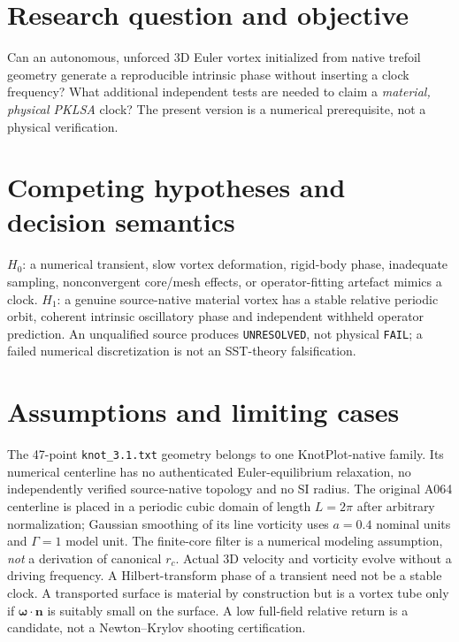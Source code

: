 \documentclass[11pt,a4paper]{article}
\begin{document}
\section{Research question and objective}
Can an autonomous, unforced 3D Euler vortex initialized from native trefoil geometry generate a reproducible intrinsic phase without inserting a clock frequency? What additional independent tests are needed to claim a \emph{material, physical PKLSA} clock? The present version is a numerical prerequisite, not a physical verification.

\section{Competing hypotheses and decision semantics}
$H_0$: a numerical transient, slow vortex deformation, rigid-body phase, inadequate sampling, nonconvergent core/mesh effects, or operator-fitting artefact mimics a clock. $H_1$: a genuine source-native material vortex has a stable relative periodic orbit, coherent intrinsic oscillatory phase and independent withheld operator prediction. An unqualified source produces \texttt{UNRESOLVED}, not physical \texttt{FAIL}; a failed numerical discretization is not an SST-theory falsification.

\section{Assumptions and limiting cases}
The 47-point \texttt{knot\_3.1.txt} geometry belongs to one KnotPlot-native family. Its numerical centerline has no authenticated Euler-equilibrium relaxation, no independently verified source-native topology and no SI radius. The original A064 centerline is placed in a periodic cubic domain of length $L=2\pi$ after arbitrary normalization; Gaussian smoothing of its line vorticity uses $a=0.4$ nominal units and $\Gamma=1$ model unit. The finite-core filter is a numerical modeling assumption, \emph{not} a derivation of canonical $r_c$. Actual 3D velocity and vorticity evolve without a driving frequency. A Hilbert-transform phase of a transient need not be a stable clock. A transported surface is material by construction but is a vortex tube only if $\bm\omega\cdot\mathbf n$ is suitably small on the surface. A low full-field relative return is a candidate, not a Newton--Krylov shooting certification.

\end{document}
